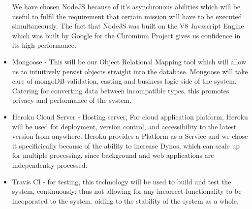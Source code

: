 \documentclass{article}
\begin{document}
\begin{itemize}
		We have chosen NodeJS because of it's asynchronous abilities which will be useful to fulfil the requirement that certain mission will have to be executed simultaneously. The fact that NodeJS was built on the V8 Javascript Engine which was built by Google for the Chromium Project gives us confidence in its high performance.
		
	 	\item Mongoose - This will be our Object Relational Mapping tool which will allow us to intuitively persist objects straight into the database. Mongoose will take care of mongoDB validation, casting and business logic side of the system. Catering for converting data between incompatible types, this promotes privacy and performance of the system.  
	 	
	 	
	 	\item Heroku Cloud Server - Hosting server, For cloud application platform, Heroku will be used for deployment, version control, and accessibility to the latest version from anywhere. Heroku provides a Platform-as-a-Service and we chose it specificically because of the ability to increase Dynos, which can scale up for multiple processing, since background and web applications are independently processed.
	 	
	 	\item Travis CI - for testing, this technology will be used to build and test the system, continuously; thus not allowing for any incorrect functionality to be incoporated to the system. aiding to the stability of the system as a whole.   
	 	
	 \end{itemize}
	 
	
	
	
	
\end{document}
